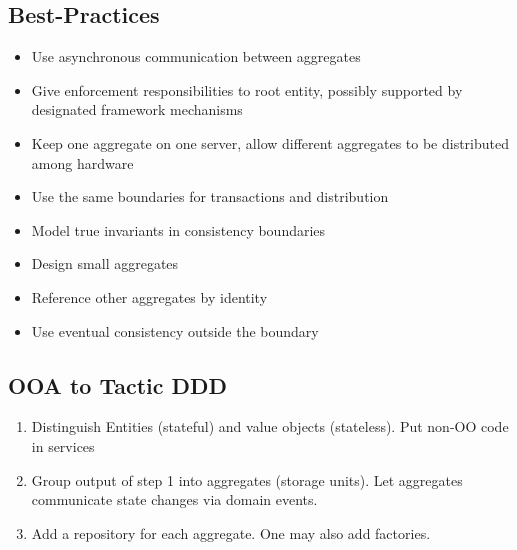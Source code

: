 \documentclass[../Main.tex]{subfiles}
\begin{document}



\subsection{Best-Practices}
\begin{itemize}
    \item Use asynchronous communication between aggregates
    \item Give enforcement responsibilities to root entity, possibly supported by designated framework mechanisms
    \item Keep one aggregate on one server, allow different aggregates to be distributed among hardware
    \item Use the same boundaries for transactions and distribution
    \item Model true invariants in consistency boundaries
    \item Design small aggregates
    \item Reference other aggregates by identity
    \item Use eventual consistency outside the boundary
\end{itemize}

\newpage

\subsection{OOA to Tactic DDD}
\begin{enumerate}
    \item Distinguish Entities (stateful) and value objects (stateless). Put non-OO code in services
    \item Group output of step 1 into aggregates (storage units). Let aggregates communicate state changes via domain events.
    \item Add a repository for each aggregate. One may also add factories.
\end{enumerate}
\newpage
\end{document}
